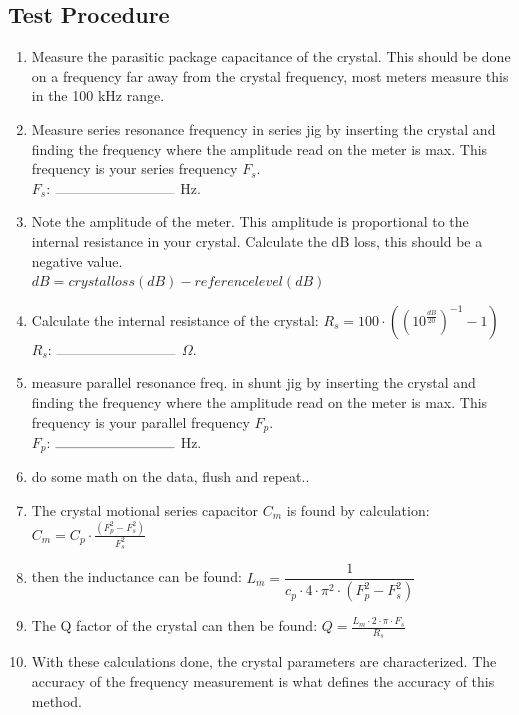 \documentclass[10pt,letterpaper]{book}
\begin{document}
\subsection*{Test Procedure}
\begin{enumerate}
	\item Measure the parasitic package capacitance of the crystal. This should be done on a frequency far away from the crystal frequency, most meters measure this in the 100 kHz range.
	
	\item Measure series resonance frequency in series jig by inserting the crystal and finding the frequency where the amplitude read on the meter is max. This frequency is your series frequency $F_{s}$.
	\vspace{30pt}
	\\$F_{s}$: $\rule{3cm}{0.1mm}$ Hz.
	
	\item Note the amplitude of the meter. This amplitude is proportional to the internal resistance in your crystal. Calculate the dB loss, this should be a negative value.\\
$ dB = crystal loss (dB) - reference level (dB) $
	\item Calculate the internal resistance of the crystal: $ R_{s} = 100\cdot((10^{\frac{dB}{20}})^{-1}-1) $
	\vspace{30pt}
	\\$R_{s}$: $\rule{3cm}{0.1mm}$ $\Omega$. 
\item measure parallel resonance freq. in shunt jig by inserting the crystal and finding the frequency where the amplitude read on the meter is max. This frequency is your parallel frequency $F_{p}$.
	\vspace{30pt} 
	\\$F_{p}$: $\rule{3cm}{0.1mm}$ Hz.
\item do some math on the data, flush and repeat.. 
\item The crystal motional series capacitor $C_{m}$ is found by calculation: \\ $ C_{m} = C_{p}\cdot\frac{(F_{p}^{2}-F_{s}^{2})}{F_{s}^{2}} $
\item then the inductance can be found: $ L_{m} = \dfrac{1}{c_{p}\cdot 4 \cdot \pi^{2} \cdot (F_{p}^{2}-F_{s}^{2}) } $
\item The Q factor of the crystal can then be found: $ Q = \frac{L_{m}\cdot 2 \cdot \pi \cdot F_{s}}{R_{s}}   $

\item With these calculations done, the crystal parameters are characterized. The accuracy of the frequency measurement is what defines the accuracy of this method. 

\end{enumerate}
\end{document}
